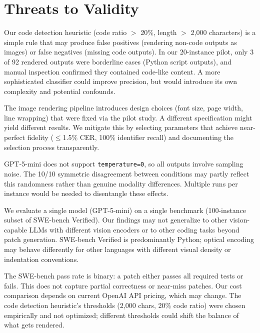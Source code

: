 \section{Threats to Validity}

Our code detection heuristic (code ratio $>$ 20\%, length $>$ 2{,}000 characters) is a simple rule that may produce false positives (rendering non-code outputs as images) or false negatives (missing code outputs). In our 20-instance pilot, only 3 of 92 rendered outputs were borderline cases (Python script outputs), and manual inspection confirmed they contained code-like content. A more sophisticated classifier could improve precision, but would introduce its own complexity and potential confounds.

The image rendering pipeline introduces design choices (font size, page width, line wrapping) that were fixed via the pilot study. A different specification might yield different results. We mitigate this by selecting parameters that achieve near-perfect fidelity ($\le$1.5\% CER, 100\% identifier recall) and documenting the selection process transparently.

GPT-5-mini does not support \texttt{temperature=0}, so all outputs involve sampling noise. The 10/10 symmetric disagreement between conditions may partly reflect this randomness rather than genuine modality differences. Multiple runs per instance would be needed to disentangle these effects.

We evaluate a single model (GPT-5-mini) on a single benchmark (100-instance subset of SWE-bench Verified). Our findings may not generalize to other vision-capable LLMs with different vision encoders or to other coding tasks beyond patch generation. SWE-bench Verified is predominantly Python; optical encoding may behave differently for other languages with different visual density or indentation conventions.

The SWE-bench pass rate is binary: a patch either passes all required tests or fails. This does not capture partial correctness or near-miss patches. Our cost comparison depends on current OpenAI API pricing, which may change. The code detection heuristic's thresholds (2{,}000 chars, 20\% code ratio) were chosen empirically and not optimized; different thresholds could shift the balance of what gets rendered.
